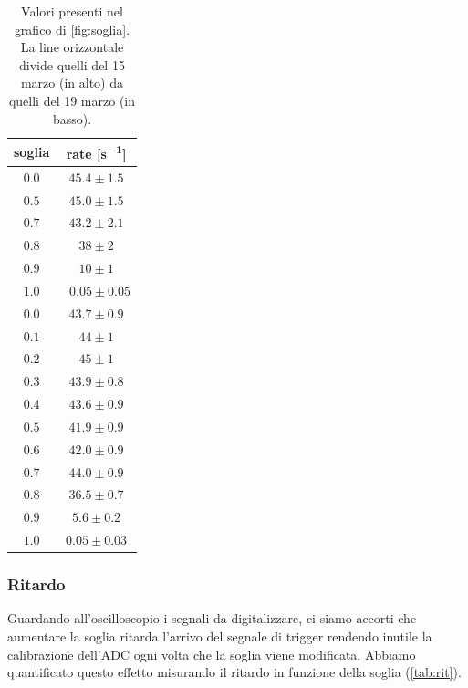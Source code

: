 \begin{table}[h]
\centering

\begin{tabular}{c|c}
soglia & rate [\si{s^{-1}}] \\
\hline
$ 0.0 $ & $ 45.4 \pm 1.5 $\\ 
$ 0.5 $ & $ 45.0 \pm 1.5 $\\ 
$ 0.7 $ & $ 43.2 \pm 2.1 $\\ 
$ 0.8 $ & $ 38 \pm 2 $\\ 
$ 0.9 $ & $ 10 \pm 1 $\\ 
$ 1.0 $ & $\;\; 0.05 \pm 0.05 $\\ 
\hline
$ 0.0 $ & $ 43.7 \pm 0.9 $\\ 
$ 0.1 $ & $ 44 \pm 1 $\\ 
$ 0.2 $ & $ 45 \pm 1 $\\ 
$ 0.3 $ & $ 43.9 \pm 0.8 $\\ 
$ 0.4 $ & $ 43.6 \pm 0.9 $\\ 
$ 0.5 $ & $ 41.9 \pm 0.9 $\\ 
$ 0.6 $ & $ 42.0 \pm 0.9 $\\ 
$ 0.7 $ & $ 44.0 \pm 0.9 $\\ 
$ 0.8 $ & $ 36.5 \pm 0.7 $\\ 
$ 0.9 $ & $ 5.6 \pm 0.2 $\\ 
$ 1.0 $ & $ 0.05 \pm 0.03 $\\ 

\end{tabular}

\caption{Valori presenti nel grafico di \autoref{fig:soglia}. La line orizzontale divide quelli del 15 marzo (in alto) da quelli del 19 marzo (in basso).}
\label{tab:soglia}
\end{table}

\subsubsection{Ritardo}

Guardando all'oscilloscopio i segnali da digitalizzare, ci siamo accorti che aumentare la soglia ritarda l'arrivo del segnale di trigger rendendo inutile la calibrazione dell'ADC ogni volta che la soglia viene modificata. Abbiamo quantificato questo effetto misurando il ritardo in funzione della soglia (\autoref{tab:rit}). 

